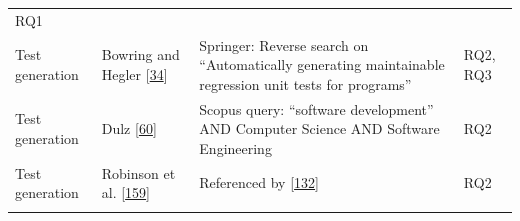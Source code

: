 \documentclass[]{book}
\begin{document}
\begin{longtable}[]{@{}llll@{}}
\begin{minipage}[t]{0.04\columnwidth}
RQ1\strut
\end{minipage}\tabularnewline
\begin{minipage}[t]{0.18\columnwidth}\raggedright\strut
Test generation\strut
\end{minipage} & \begin{minipage}[t]{0.16\columnwidth}\raggedright\strut
Bowring and Hegler
{[}\protect\hyperlink{ref-bowring2014obsidian}{34}{]}\strut
\end{minipage} & \begin{minipage}[t]{0.50\columnwidth}\raggedright\strut
Springer: Reverse search on ``Automatically generating maintainable
regression unit tests for programs''\strut
\end{minipage} & \begin{minipage}[t]{0.04\columnwidth}\raggedright\strut
RQ2, RQ3\strut
\end{minipage}\tabularnewline
\begin{minipage}[t]{0.18\columnwidth}\raggedright\strut
Test generation\strut
\end{minipage} & \begin{minipage}[t]{0.16\columnwidth}\raggedright\strut
Dulz {[}\protect\hyperlink{ref-dulz2013model}{60}{]}\strut
\end{minipage} & \begin{minipage}[t]{0.50\columnwidth}\raggedright\strut
Scopus query: ``software development'' AND Computer Science AND Software
Engineering\strut
\end{minipage} & \begin{minipage}[t]{0.04\columnwidth}\raggedright\strut
RQ2\strut
\end{minipage}\tabularnewline
\begin{minipage}[t]{0.18\columnwidth}\raggedright\strut
Test generation\strut
\end{minipage} & \begin{minipage}[t]{0.16\columnwidth}\raggedright\strut
Robinson et al. {[}\protect\hyperlink{ref-robinson2011}{159}{]}\strut
\end{minipage} & \begin{minipage}[t]{0.50\columnwidth}\raggedright\strut
Referenced by
{[}\protect\hyperlink{ref-supportingtestsuite}{132}{]}\strut
\end{minipage} & \begin{minipage}[t]{0.04\columnwidth}\raggedright\strut
RQ2\strut
\end{minipage}\tabularnewline
\begin{minipage}[t]{0.18\columnwidth}\raggedright\strut

\end{minipage}
\end{longtable}
\end{document}
